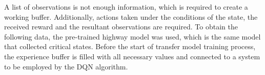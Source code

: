 A list of observations is not enough information, which is required to create a working buffer. Additionally, actions taken under the conditions of the state, the received reward and the resultant observations are required. To obtain the following data, the pre-trained highway model was used, which is the same model that collected critical states. Before the start of transfer model training process, the experience buffer is filled with all necessary values and connected to a system to be employed by the DQN algorithm.

